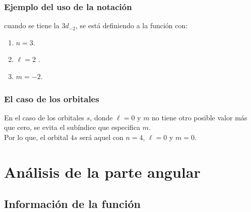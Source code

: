 \documentclass[12pt]{beamer}
\begin{document}
\begin{frame}
\frametitle{Ejemplo del uso de la notación}
cuando se tiene la $3 d_{-2}$, se está definiendo a la función con:
\begin{enumerate}[<+->]
\item $n = 3$.
\item $\ell = 2$ .
\item $m = -2$.
\end{enumerate}
\end{frame}
\begin{frame}
\frametitle{El caso de los orbitales}
En el caso de los orbitales $s$, donde $\ell = 0$ y $m$ no tiene otro posible valor más que cero, \pause se evita el subíndice que especifica $m$. 
\\
\bigskip
\pause
Por lo que, el orbital $4s$ será aquel con $n = 4$, $\ell = 0$ y $m = 0$.
\end{frame}

\section{Análisis de la parte angular}
\subsection{Información de la función}
\end{document}
